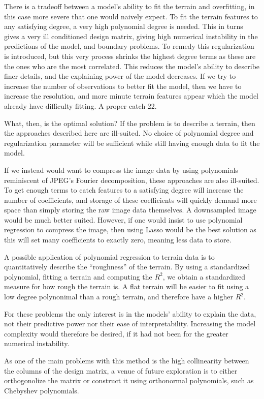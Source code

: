 There is a tradeoff between a model's ability to fit the terrain and
overfitting, in this case more severe that one would naively expect. To fit the
terrain features to any satisfying degree, a very high polynomial degree is
needed. This in turns gives a very ill conditioned design matrix, giving high
numerical instability in the predictions of the model, and boundary problems. To
remedy this regularization is introduced, but this very process shrinks the
highest degree terms as these are the ones who are the most correlated. This
reduces the model's ability to describe finer details, and the explaining power
of the model decreases. If we try to increase the number of observations to
better fit the model, then we have to increase the resolution, and more
minute terrain features appear which the model already have difficulty fitting. A proper catch-22.

What, then, is the optimal solution? If the problem is to describe a terrain, then the
approaches described here are ill-suited. No choice of polynomial degree and
regularization parameter will be sufficient while still having enough data to fit the
model.

If we instead would want to compress the image data by using polynomials
reminiscent of JPEG's Fourier decomposition, these approaches are also
ill-suited. To get enough terms to catch features to a satisfying degree will
increase the number of coefficients, and storage of these coefficients will
quickly demand more space than simply storing the raw image data themselves. A
downsampled image would be much better suited. However, if one would insist to
use polynomial regression to compress the image, then using Lasso would be the
best solution as this will set many coefficients to exactly zero, meaning less
data to store. 

A possible application of polynomial regression to terrain data is to
quantitatively describe the ``roughness'' of the terrain. By using a
standardized polynomial, fitting a terrain and computing the \(R^{2}\), we
obtain a standardized measure for how rough the terrain is. A flat terrain will
be easier to fit using a low degree polynonimal than a rough terrain, and
therefore have a higher \(R^{2}\).

For these problems the only interest is in the models' ability to explain the data, not their
predictive power nor their ease of interpretability. Increasing the model
complexity would therefore be desired, if it had not been for the greater
numerical instability.

As one of the main problems with this method is the high collinearity between
the columns of the design matrix, a venue of future exploration is to either
orthogonolize the matrix or construct it using orthonormal polynomials, such as
Chebyshev polynomials. 